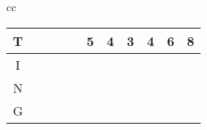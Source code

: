 \begin{table}
\begin{center}
\begin{tabular}[c]{cc}
{\begin{tabular}[c]{c|c|c|c|c|c|c|c|c|c|c|}
				T &                       &                       &                      &                       & \cellcolor{green!25}5 & \cellcolor{green!25}4 & \cellcolor{blue!25}3 & \cellcolor{green!25}4 & \cellcolor{green!25}6 & \cellcolor{green!25}8 \\\hline
				I &                       &                       &                      &                       & \cellcolor{green!25}  & \cellcolor{green!25}  & \cellcolor{green!25} & \cellcolor{green!25}  & \cellcolor{green!25}  & \cellcolor{green!25}  \\\hline
				N &                       &                       &                      &                       & \cellcolor{green!25}  & \cellcolor{green!25}  & \cellcolor{green!25} & \cellcolor{green!25}  & \cellcolor{green!25}  & \cellcolor{green!25}  \\\hline
				G &                       &                       &                      &                       & \cellcolor{green!25}  & \cellcolor{green!25}  & \cellcolor{green!25} & \cellcolor{green!25}  & \cellcolor{green!25}  & \cellcolor{blue!25}   \\\hline
			\end{tabular}
        } \\
        \addlinespace[1cm]
\end{tabular}
\end{center}
\end{table}
